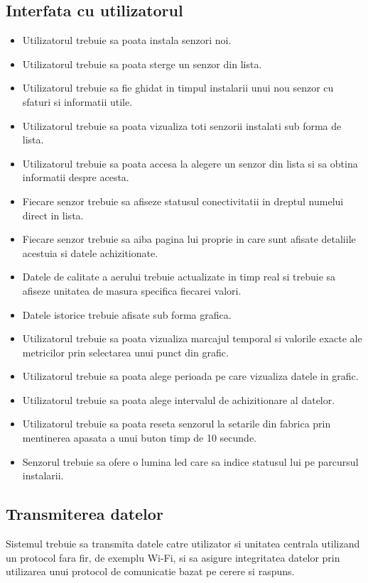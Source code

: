 \subsection{Interfata cu utilizatorul}\label{subsec:cf_interfata}
\begin{itemize}
    \item Utilizatorul trebuie sa poata instala senzori noi.
    \item Utilizatorul trebuie sa poata sterge un senzor din lista.
    \item Utilizatorul trebuie sa fie ghidat in timpul instalarii unui nou senzor cu sfaturi si informatii utile.
    \item Utilizatorul trebuie sa poata vizualiza toti senzorii instalati sub forma de lista.
    \item Utilizatorul trebuie sa poata accesa la alegere un senzor din lista si sa obtina informatii despre acesta.
    \item Fiecare senzor trebuie sa afiseze statusul conectivitatii in dreptul numelui direct in lista.
    \item Fiecare senzor trebuie sa aiba pagina lui proprie in care sunt afisate detaliile acestuia si datele achizitionate.
    \item Datele de calitate a aerului trebuie actualizate in timp real si trebuie sa afiseze unitatea de masura specifica fiecarei valori.
    \item Datele istorice trebuie afisate sub forma grafica.
    \item Utilizatorul trebuie sa poata vizualiza marcajul temporal si valorile exacte ale metricilor prin selectarea unui punct din grafic.
    \item Utilizatorul trebuie sa poata alege perioada pe care vizualiza datele in grafic.
    \item Utilizatorul trebuie sa poata alege intervalul de achizitionare al datelor.
    \item Utilizatorul trebuie sa poata reseta senzorul la setarile din fabrica prin mentinerea apasata a unui buton timp de 10 secunde.
    \item Senzorul trebuie sa ofere o lumina led care sa indice statusul lui pe parcursul instalarii.
\end{itemize}

\subsection{Transmiterea datelor}\label{subsec:cf_transmitere}
Sistemul trebuie sa transmita datele catre utilizator si unitatea centrala utilizand un protocol fara fir, de exemplu Wi-Fi, si sa asigure integritatea 
datelor prin utilizarea unui protocol de comunicatie bazat pe cerere si raspuns.
 

